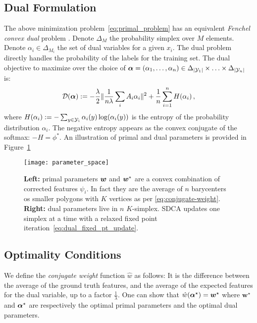 \subsection{Dual Formulation}
The above minimization problem~\eqref{eq:primal_problem} has an equivalent {\it Fenchel convex dual} problem \citep{lebanon2002boosting}.
Denote $\Delta_{M}$ the probability simplex over $M$ elements.
Denote $\alpha_i \in \Delta_{M_i}$ the set of dual variables for a given $x_i$.
The dual problem directly handles the probability of the labels for the training set.
The dual objective to maximize over the choice of $\boldsymbol{\alpha} = (\alpha_1, \ldots, \alpha_n) \in \Delta_{|{\mathcal Y}_1|} \times \ldots \times \Delta_{|{\mathcal Y}_n|} $ is:
\begin{equation}
	\label{dual problem}
	{\mathcal D}(\boldsymbol{\alpha}) := -\frac{\lambda}{2} \| \frac{1}{n \lambda} \sum_i A_i \alpha_i \|^2
	+ \frac{1}{n} \sum_{i=1}^n H(\alpha_i) \, ,
\end{equation}
where $H(\alpha_i) := - \sum_{y \in {\mathcal Y}_i} \alpha_i(y) \log(\alpha_i(y))$ is the entropy of the probability distribution $\alpha_i$. The negative entropy appears as the convex conjugate of the softmax: $-H = \phi^*$.
An illustration of primal and dual parameters is provided in Figure~\ref{fig:sdca}

\begin{figure}[t]
	\centering
	\texttt{[image: parameter\_space]}
	\caption[
		Illustration of SDCA
	]{
		\textbf{Left:} primal parameters  $\boldsymbol{w}$ and $\boldsymbol{w}^*$ are a convex combination of corrected features $\psi_i$. In fact they are the average of $n$  barycenters os smaller polygons with $K$ vertices as per \eqref{eq:conjugate-weight}.
		\textbf{Right:} dual parameters live in $n$ $K$-simplex. SDCA updates one simplex at a time with a relaxed fixed point iteration~\eqref{eq:dual_fixed_pt_update}.
	}
	\label{fig:sdca}
\end{figure}

\subsection{Optimality Conditions}
We define the \emph{conjugate weight} function $\hat{w}$ as follows:
It is the difference between the average of the ground truth features, and the average of the expected features for the dual variable, up to a factor $\frac{1}{\lambda}$.
One can show that $\hat{w}(\boldsymbol{\alpha}^{\star}) = \bm w^{\star}$ where $\bm w^{\star}$ and $\boldsymbol{\alpha}^{\star}$ are respectively the optimal primal parameters and the optimal dual parameters.

